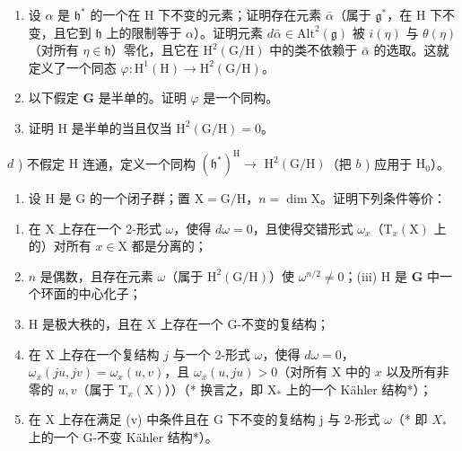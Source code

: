 \begin{enumerate}
\begin{enumerate}
\def\labelenumi{\alph{enumi})}
\item
  设 \(\alpha\) 是 \(\mathfrak{h}^*\) 的一个在 H 下不变的元素；证明存在元素 \(\bar{\alpha}\)（属于 \(\mathfrak{g}^*\)，在 H 下不变，且它到 \(\mathfrak{h}\) 上的限制等于 \(\alpha\)）。证明元素 \(d\bar{\alpha} \in \mathrm{Alt}^2(\mathfrak{g})\) 被 \(i(\eta)\) 与 \(\theta(\eta)\)（对所有 \(\eta \in \mathfrak{h}\)）零化，且它在 \(\mathrm{H}^2(\mathrm{G}/\mathrm{H})\) 中的类不依赖于 \(\bar{\alpha}\) 的选取。这就定义了一个同态 \(\varphi: \mathrm{H}^1(\mathrm{H}) \to \mathrm{H}^2(\mathrm{G}/\mathrm{H})\)。
\item
  以下假定 \(\mathbf{G}\) 是半单的。证明 \(\varphi\) 是一个同构。
\item
  证明 \(\mathrm{H}\) 是半单的当且仅当 \(\mathrm{H}^2 (\mathrm{G / H}) = 0\)。
\end{enumerate}

\(d\) ) 不假定 \(\mathrm{H}\) 连通，定义一个同构 \((\mathfrak{h}^{*})^{\mathrm{H}}\to\) \(\mathrm{H}^2 (\mathrm{G / H})\)（把 \(b\) ) 应用于 \(\mathrm{H}_0\)）。

\begin{enumerate}
\def\labelenumi{\arabic{enumi})}
\setcounter{enumi}{12}
\tightlist
\item
  设 \(\mathrm{H}\) 是 \(\mathrm{G}\) 的一个闭子群；置 \(\mathrm{X} = \mathrm{G} / \mathrm{H}\)，\(n = \dim \mathrm{X}\)。证明下列条件等价：
\end{enumerate}

\begin{enumerate}
\def\labelenumi{(\roman{enumi})}
\item
  在 X 上存在一个 2-形式 \(\omega\)，使得 \(d\omega = 0\)，且使得交错形式 \(\omega_{x}\)（\(\mathrm{T}_x(\mathrm{X})\) 上的）对所有 \(x\in \mathrm{X}\) 都是分离的；
\item
  \(n\) 是偶数，且存在元素 \(\omega\)（属于 \(\mathrm{H}^2 (\mathrm{G / H})\)）使 \(\omega^{n / 2}\neq 0\)；(iii) \(\mathrm{H}\) 是 \(\mathbf{G}\) 中一个环面的中心化子；
\item
  H 是极大秩的，且在 X 上存在一个 G-不变的复结构；
\item
  在 X 上存在一个复结构 \(j\) 与一个 2-形式 \(\omega\)，使得 \(d\omega = 0\)，\(\omega_{x}(ju,jv) = \omega_{x}(u,v)\)，且 \(\omega_{x}(u,ju) > 0\)（对所有 X 中的 \(x\) 以及所有非零的 \(u,v\)（属于 \(\mathrm{T}_x(\mathrm{X})\)））（* 换言之，即 \(\mathrm{X}_{*}\) 上的一个 Kähler 结构*）；
\item
  在 X 上存在满足 (v) 中条件且在 G 下不变的复结构 j 与 2-形式 \(\omega\)（* 即 \(X_{*}\) 上的一个 G-不变 Kähler 结构*）。
\end{enumerate}


\end{enumerate}

